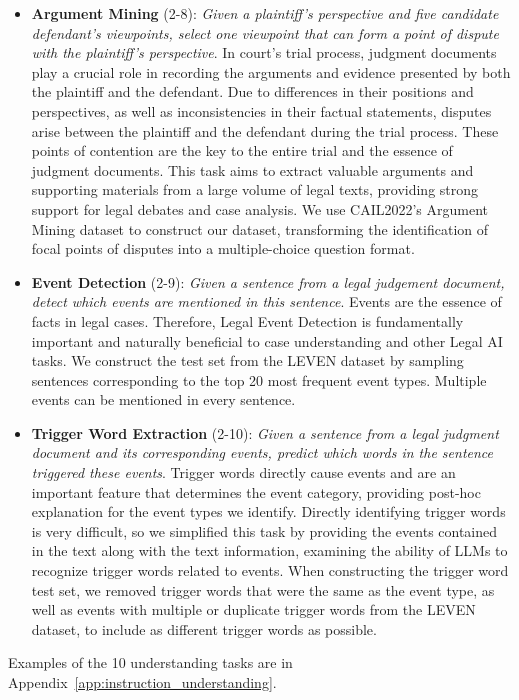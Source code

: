 \begin{itemize}
    \item \textbf{Argument Mining} (2-8): \emph{Given a plaintiff's perspective and five candidate defendant's viewpoints, select one viewpoint that can form a point of dispute with the plaintiff's perspective}. In court's trial process, judgment documents play a crucial role in recording the arguments and evidence presented by both the plaintiff and the defendant. Due to differences in their positions and perspectives, as well as inconsistencies in their factual statements, disputes arise between the plaintiff and the defendant during the trial process. These points of contention are the key to the entire trial and the essence of judgment documents. This task aims to extract valuable arguments and supporting materials from a large volume of legal texts, providing strong support for legal debates and case analysis. We use CAIL2022's Argument Mining dataset to construct our dataset, transforming the identification of focal points of disputes into a multiple-choice question format.
    \item \textbf{Event Detection} (2-9):
\emph{Given a sentence from a legal judgement document, detect which events are mentioned in this sentence}. Events are the essence of facts in legal cases. Therefore, Legal Event Detection is fundamentally important and naturally beneficial to case understanding and other Legal AI tasks. We construct the test set from the LEVEN dataset\cite{yao2022leven} by sampling sentences corresponding to the top 20 most frequent event types. Multiple events can be mentioned in every sentence.
    \item \textbf{Trigger Word Extraction} (2-10):
\emph{Given a sentence from a legal judgment document and its corresponding events, predict which words in the sentence triggered these events}. Trigger words directly cause events and are an important feature that determines the event category, providing post-hoc explanation for the event types we identify. Directly identifying trigger words is very difficult, so we simplified this task by providing the events contained in the text along with the text information,  examining the ability of LLMs to recognize trigger words related to events. When constructing the trigger word test set, we removed trigger words that were the same as the event type, as well as events with multiple or duplicate trigger words from the LEVEN dataset\cite{yao2022leven}, to include as different trigger words as possible.
\end{itemize}
Examples of the 10 understanding tasks are in Appendix~\ref{app:instruction_understanding}.

